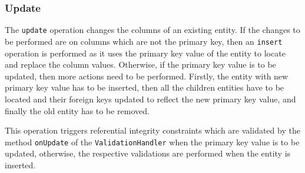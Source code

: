 		
		
		\subsubsection{Update}\label{ss:update}
		
		The \texttt{update} operation changes the columns of an existing entity. If
		the changes to be performed are on columns which are not the primary key, then
		an \texttt{insert} operation is performed as it uses the primary key value of
		the entity to locate and replace the column values. Otherwise, if the
		primary key value is to be updated, then more actions need to be performed.
		Firstly, the entity with new primary key value has to be inserted, then all
		the children entities have to be located and their foreign keys updated to
		reflect the new primary key value, and finally the old entity has to be
		removed. 
		
		This operation triggers referential integrity constraints which are
		validated by the method \texttt{onUpdate} of the \texttt{ValidationHandler}
		when the primary key value is to be updated, otherwise, the respective
		validations are performed when the entity is inserted. 
		
